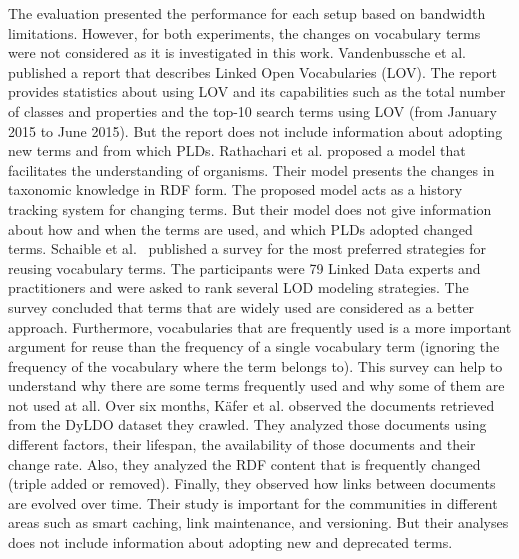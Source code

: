 The evaluation presented the performance for each setup based on bandwidth limitations. 
However, for both experiments, the changes on vocabulary terms were not considered as it is investigated in this work.
%
%
Vandenbussche et al. \cite{vandenbussche2017linked} published a report that describes Linked Open Vocabularies (LOV). 
The report provides statistics about using LOV and its capabilities such as the total number of classes and properties and the top-10 search terms using LOV (from January 2015 to June 2015). But the report does not include information about adopting new terms and from which PLDs.
%
Rathachari et al. \cite{chawuthai2016presenting} proposed a model that facilitates the understanding of organisms.  
Their model presents the changes in taxonomic knowledge in RDF form. 
%
%
The proposed model acts as a history tracking system for changing terms. But their model does not give information about how and when the terms are used, and which PLDs adopted changed terms. 
%
Schaible et al.~\cite{schaible2014survey} published a survey for the most preferred strategies for reusing vocabulary terms. 
The participants were 79 Linked Data experts and practitioners and were asked to rank several LOD modeling strategies. 
The survey concluded that terms that are widely used are considered as a better approach. 
Furthermore, vocabularies that are frequently used is a more important argument for reuse than the frequency of a single vocabulary term (ignoring the frequency of the vocabulary where the term belongs to). 
%
This survey can help to understand why there are some terms frequently used and why some of them are not used at all.
%
%
Over six months, K\"afer et al.\cite{kafer2013observing} observed the documents retrieved from the DyLDO dataset they crawled. 
They analyzed those documents using different factors, their lifespan, the availability of those documents and their change rate. 
Also, they analyzed the RDF content that is frequently changed (triple added or removed).
Finally, they observed how links between documents are evolved over time.
Their study is important for the communities in different areas such as smart caching, link maintenance, and versioning.
But their analyses does not include information about adopting new and deprecated terms.

